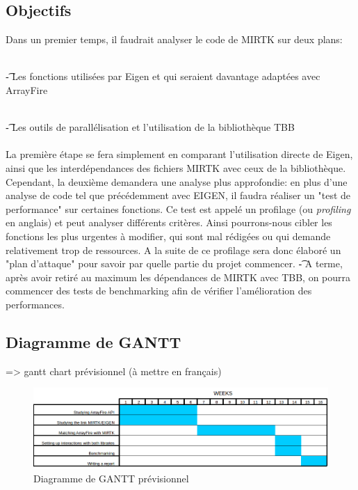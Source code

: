 \documentclass[10pt]{report}
\begin{document}
	\subsection{Objectifs} 
	\noindent Dans un premier temps, il faudrait analyser le code de MIRTK sur deux plans:\\~\par 
	\t - Les fonctions utilisées par Eigen et qui seraient davantage adaptées avec ArrayFire \\~\par
	\t - Les outils de parallélisation et l'utilisation de la bibliothèque TBB \\\\
	La première étape se fera simplement en comparant l'utilisation directe de Eigen, ainsi que les interdépendances des fichiers MIRTK avec ceux de la bibliothèque. Cependant, la deuxième demandera une analyse plus approfondie: en plus d'une analyse de code tel que précédemment avec EIGEN, il faudra réaliser un "test de performance" sur certaines fonctions. Ce test est appelé un profilage (ou \textit{profiling} en anglais) et peut analyser différents critères. Ainsi pourrons-nous cibler les fonctions les plus urgentes à modifier, qui sont mal rédigées ou qui demande relativement trop de ressources.
	A la suite de ce profilage sera donc élaboré un "plan d'attaque" pour savoir par quelle partie du projet commencer.
	\t - A terme, après avoir retiré au maximum les dépendances de MIRTK avec TBB, on pourra commencer des tests de benchmarking afin de vérifier l'amélioration des performances.
	\subsection{Diagramme de GANTT}
	 => gantt chart prévisionnel (à mettre en français)
	\begin{figure}[h!]
		\begin{center}
			\includegraphics[width=18cm]{Reports/figures/estimated_gantt.png}
		\end{center}	
		\caption{Diagramme de GANTT prévisionnel}
		\label{Diagramme de GANTT prévisionnel}
	\end{figure}
\end{document}
